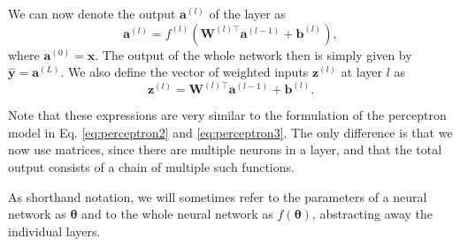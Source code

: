 We can now denote the output $\bm{a}^{(l)}$ of the  layer as
\begin{equation}
\bm{a}^{(l)} = f^{(l)}\left(\bm{W}^{(l)\top}\bm{a}^{(l-1)}+\bm{b}^{(l)}\right),
\end{equation}
where $\bm{a}^{(0)} = \bm{x}$. The output of the whole network then is simply given by $\hat{\bm{y}} = \bm{a}^{(L)}$. We also define the vector of weighted inputs $\bm{z}^{(l)}$ at layer $l$ as
\begin{equation}
\bm{z}^{(l)} = \bm{W}^{(l)\top}\bm{a}^{(l-1)}+\bm{b}^{(l)}.
\end{equation}

Note that these expressions are very similar to the formulation of the perceptron model in Eq. \eqref{eq:perceptron2} and \eqref{eq:perceptron3}. The only difference is that we now use matrices, since there are multiple neurons in a layer, and that the total output consists of a chain of multiple such functions.

As shorthand notation, we will sometimes refer to the parameters of a neural network as $\bm{\theta}$ and to the whole neural network as $f(\bm{\theta})$, abstracting away the individual layers.
\begin{comment}
\begin{equation}
f(\bm{x}) = f^{(L)}(\bm{W}^{(L)\top}f^{(L-1)}(\bm{W}^{(L-1)\top}\dotsm+\bm{b}^{(l-1)})+\bm{b}^{(L)}
\end{equation}
\end{comment}